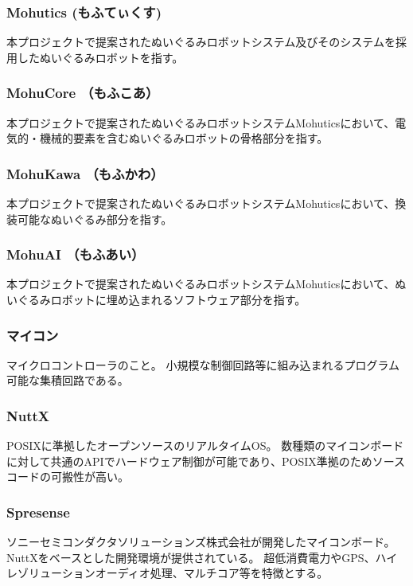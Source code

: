 \documentclass[uplatex,a4paper,12pt]{jsarticle}
\begin{document}
\subsubsection*{Mohutics (もふてぃくす) \label{term:mohutics}}
本プロジェクトで提案されたぬいぐるみロボットシステム及びそのシステムを採用したぬいぐるみロボットを指す。

\subsubsection*{MohuCore （もふこあ）\label{term:mohucore}}
本プロジェクトで提案されたぬいぐるみロボットシステムMohuticsにおいて、電気的・機械的要素を含むぬいぐるみロボットの骨格部分を指す。

\subsubsection*{MohuKawa （もふかわ）\label{term:mohukawa}}
本プロジェクトで提案されたぬいぐるみロボットシステムMohuticsにおいて、換装可能なぬいぐるみ部分を指す。

\subsubsection*{MohuAI （もふあい）\label{term:mohuai}}
本プロジェクトで提案されたぬいぐるみロボットシステムMohuticsにおいて、ぬいぐるみロボットに埋め込まれるソフトウェア部分を指す。

\subsubsection*{マイコン}
マイクロコントローラのこと。
小規模な制御回路等に組み込まれるプログラム可能な集積回路である。

\subsubsection*{NuttX}
POSIXに準拠したオープンソースのリアルタイムOS。
数種類のマイコンボードに対して共通のAPIでハードウェア制御が可能であり、POSIX準拠のためソースコードの可搬性が高い。

\subsubsection*{Spresense}
ソニーセミコンダクタソリューションズ株式会社が開発したマイコンボード。
NuttXをベースとした開発環境が提供されている。
超低消費電力やGPS、ハイレゾリューションオーディオ処理、マルチコア等を特徴とする。
\end{document}
